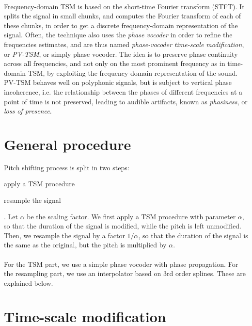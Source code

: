 \documentclass[letterpaper]{article}
\theoremstyle{definition}
\theoremstyle{remark}
\begin{document}
\paragraph{} Frequency-domain TSM is based on the short-time Fourier transform
(STFT). It splits the signal in small chunks, and computes the Fourier transform
of each of these chunks, in order to get a discrete frequency-domain
representation of the signal. Often, the technique also uses the \emph{phase
vocoder} in order to refine the frequencies estimates, and are thus named
\emph{phase-vocoder time-scale modification}, or \emph{PV-TSM}, or simply phase
vocoder. The idea is to preserve phase continuity across all frequencies, and
not only on the most prominent frequency as in time-domain TSM, by exploiting
the frequency-domain representation of the sound. PV-TSM behaves well on
polyphonic signals, but is subject to vertical phase incoherence, i.e. the
relationship between the phases of different frequencies at a point of time is
not preserved, leading to audible artifacts, known as \emph{phasiness}, or
\emph{loss of presence}.

\section{General procedure}
\label{sec:procedure}
Pitch shifting process is split in two steps:
\begin{enumerate*}[label=\arabic*)] \item apply a TSM procedure \item resample
the signal\end{enumerate*}. Let \(\alpha\) be the scaling factor. We first apply
a TSM procedure with parameter \(\alpha\), so that the duration of the signal is
modified, while the pitch is left unmodified. Then, we resample the signal by a
factor \(1/\alpha\), so that the duration of the signal is the same as the
original, but the pitch is multiplied by \(\alpha\).

\paragraph{}
For the TSM part, we use a simple phase vocoder with phase propagation. For the
resampling part, we use an interpolator based on 3rd order splines. These are
explained below.

\section{Time-scale modification}
\end{document}
